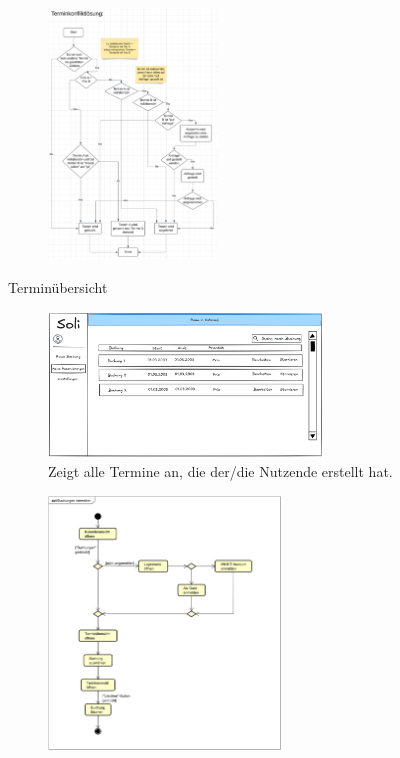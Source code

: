 \documentclass{sdqbeamer}
\begin{document}
\begin{frame}[plain]
    \begin{figure}
        \centering
        \includegraphics[width=0.4\textwidth]{pictures/figures/activity/terminkonfliktloesung}
        \label{fig:terminkonflikt}
    \end{figure}
\end{frame}

\begin{frame}{Terminübersicht}
    \begin{figure}
        \centering
        \includegraphics[width=0.65\textwidth]{pictures/figures/ui/reservierungsuebersicht}
        \caption{Zeigt alle Termine an, die der/die Nutzende erstellt hat.}
        \label{fig:terminuebersicht}
    \end{figure}
\end{frame}

\begin{frame}[plain]
    \begin{figure}
        \centering
        \includegraphics[width=0.55\textwidth]{pictures/figures/activity/buchungverwalten}
        \label{fig:terminuebersichtprozess}
    \end{figure}
\end{frame}
\end{document}
